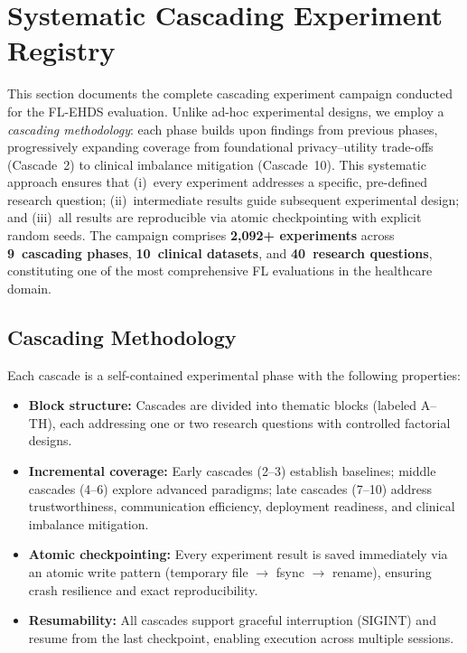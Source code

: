 \documentclass[conference,a4paper]{IEEEtran}
\begin{document}
\clearpage
\section{Systematic Cascading Experiment Registry}
\label{sec:cascade_registry}

This section documents the complete cascading experiment campaign conducted for the FL-EHDS evaluation. Unlike ad-hoc experimental designs, we employ a \textit{cascading methodology}: each phase builds upon findings from previous phases, progressively expanding coverage from foundational privacy--utility trade-offs (Cascade~2) to clinical imbalance mitigation (Cascade~10). This systematic approach ensures that (i)~every experiment addresses a specific, pre-defined research question; (ii)~intermediate results guide subsequent experimental design; and (iii)~all results are reproducible via atomic checkpointing with explicit random seeds. The campaign comprises \textbf{2,092+ experiments} across \textbf{9~cascading phases}, \textbf{10~clinical datasets}, and \textbf{40~research questions}, constituting one of the most comprehensive FL evaluations in the healthcare domain.

\subsection{Cascading Methodology}

Each cascade is a self-contained experimental phase with the following properties:

\begin{itemize}
    \item \textbf{Block structure:} Cascades are divided into thematic blocks (labeled A--TH), each addressing one or two research questions with controlled factorial designs.
    \item \textbf{Incremental coverage:} Early cascades (2--3) establish baselines; middle cascades (4--6) explore advanced paradigms; late cascades (7--10) address trustworthiness, communication efficiency, deployment readiness, and clinical imbalance mitigation.
    \item \textbf{Atomic checkpointing:} Every experiment result is saved immediately via an atomic write pattern (temporary file $\to$ fsync $\to$ rename), ensuring crash resilience and exact reproducibility.
    \item \textbf{Resumability:} All cascades support graceful interruption (SIGINT) and resume from the last checkpoint, enabling execution across multiple sessions.
\end{itemize}
\end{document}

